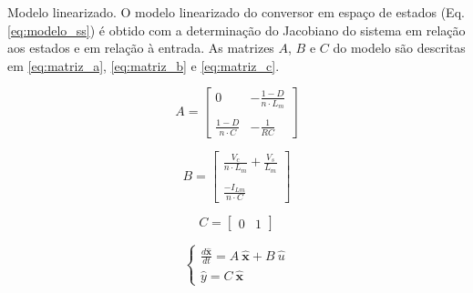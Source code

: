 \documentclass[xcolor=dvipsnames,aspectratio=169]{beamer}
\begin{document}
\begin{frame}{Modelo linearizado.}
    \justifying
    O modelo linearizado do conversor em espaço de estados (Eq. \eqref{eq:modelo_ss}) é obtido com a determinação do Jacobiano do sistema em relação aos estados e em relação à entrada. As matrizes \(A\), \(B\) e \(C\) do modelo são descritas em \eqref{eq:matriz_a}, \eqref{eq:matriz_b} e \eqref{eq:matriz_c}.

    \begin{equation}
        A =
        \begin{bmatrix}
            0                     & - \frac{1-D}{n\cdot L_m} \\ \\
            \frac{1-D}{n \cdot C} & -\frac{1}{R C}
        \end{bmatrix}
        \label{eq:matriz_a}
    \end{equation}

    \begin{equation}
        B =
        \begin{bmatrix}
            \frac{V_c}{n \cdot L_m} + \frac{V_s}{L_m} \\ \\
            \frac{- I_{Lm}}{n \cdot C}
        \end{bmatrix}
        \label{eq:matriz_b}
    \end{equation}

    \begin{equation}
        C = \begin{bmatrix}
            0 & 1
        \end{bmatrix}
        \label{eq:matriz_c}
    \end{equation}

    \begin{equation}
        \begin{cases}
            \frac{d \mathbf{\hat{x}}}{d t} = A\ \mathbf{\hat{x}} + B\ \hat{u} \\
            \hat{y} = C\ \mathbf{\hat{x}}
        \end{cases}
        \label{eq:modelo_ss}
    \end{equation}

\end{frame}
\end{document}
